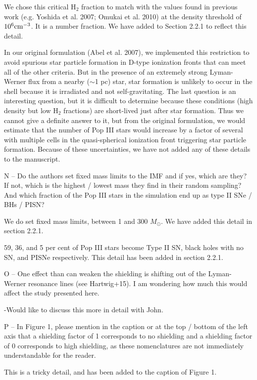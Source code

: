 \documentclass[11pt]{article}
\newenvironment{referee}[1][]{%
    \ignorespaces%
    \begin{mdframed}[style=myquotestyle,#1]%
}{%
    \end{mdframed}%
    \ignorespacesafterend%
}%
\begin{document}
We chose this critical H$_2$ fraction to match with the values found in previous work (e.g. Yoshida et al. 2007; Omukai et al. 2010) at the density threshold of $10^6 \cubecm$.  It is a number fraction.  We have added to Section 2.2.1 to reflect this detail.

In our original formulation (Abel et al. 2007), we implemented this restriction to avoid spurious star particle formation in D-type ionization fronts that can meet all of the other criteria.  But in the presence of an extremely strong Lyman-Werner flux from a nearby ($\sim$1 pc) star, star formation is unlikely to occur in the shell because it is irradiated and not self-gravitating. The last question is an interesting question, but it is difficult to determine because these conditions (high density but low H$_2$ fractions) are short-lived just after star formation.  Thus we cannot give a definite answer to it, but from the original formulation, we would estimate that the number of Pop III stars would increase by a factor of several with multiple cells in the quasi-spherical ionization front triggering star particle formation.  Because of these uncertainties, we have not added any of these details to the manuscript.

\begin{referee}
N -- Do the authors set fixed mass limits to the IMF and if yes, which are they?  If not, which is the highest / lowest mass they find in their random sampling?  And which fraction of the Pop III stars in the simulation end up as type II SNe / BHs / PISN?
\end{referee}
We do set fixed mass limits, between 1 and 300 $M_{\odot}$. We have added this detail in section 2.2.1.  

59, 36, and 5 per cent of Pop III stars become Type II SN, black holes with no SN, and PISNe respectively. This detail has been added in section 2.2.1.

\begin{referee}
O -- One effect than can weaken the shielding is shifting out of the Lyman-Werner resonance lines (see Hartwig+15). I am wondering how much this would affect the study presented here.
\end{referee}
-Would like to discuss this more in detail with John.


\begin{referee}
P -- In Figure 1, please mention in the caption or at the top / bottom of the left axis that a shielding factor of 1 corresponds to no shielding and a shielding factor of 0 corresponds to high shielding, as these nomenclatures are not immediately understandable for the reader.
\end{referee}
This is a tricky detail, and has been added to the caption of Figure 1.
\end{document}

